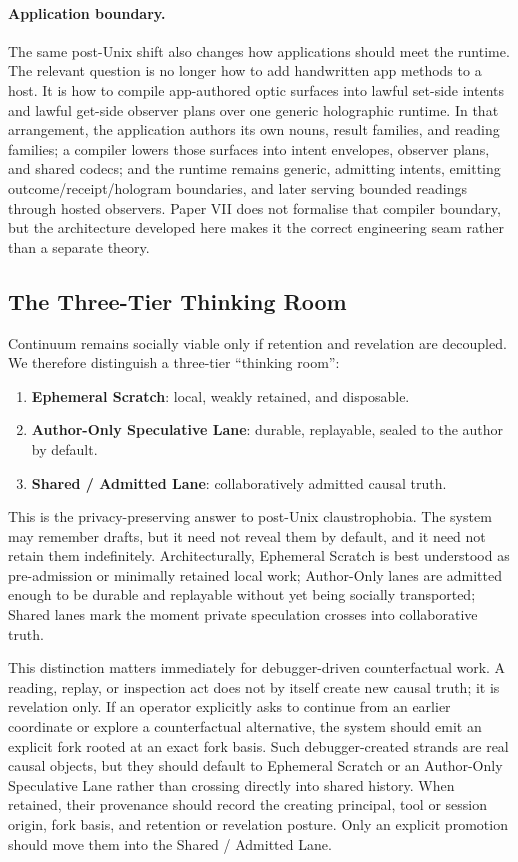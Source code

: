 \documentclass[11pt]{article}
\theoremstyle{definition}
\theoremstyle{plain}
\theoremstyle{remark}
\begin{document}
\paragraph{Application boundary.}
The same post-Unix shift also changes how applications should meet the runtime.
The relevant question is no longer how to add handwritten app methods to a host.
It is how to compile app-authored optic surfaces into lawful set-side intents
and lawful get-side observer plans over one generic holographic runtime. In
that arrangement, the application authors its own nouns, result families, and
reading families; a compiler lowers those surfaces into intent envelopes,
observer plans, and shared codecs; and the runtime remains generic, admitting
intents, emitting outcome/receipt/hologram boundaries, and later serving
bounded readings through hosted observers. Paper VII does not formalise that
compiler boundary, but the architecture developed here makes it the correct
engineering seam rather than a separate theory.

\subsection{The Three-Tier Thinking Room}

Continuum remains socially viable only if retention and revelation are decoupled. We therefore distinguish a three-tier ``thinking room'':

\begin{enumerate}[leftmargin=*]
  \item \textbf{Ephemeral Scratch}: local, weakly retained, and disposable.
  \item \textbf{Author-Only Speculative Lane}: durable, replayable, sealed to the author by default.
  \item \textbf{Shared / Admitted Lane}: collaboratively admitted causal truth.
\end{enumerate}

This is the privacy-preserving answer to post-Unix claustrophobia. The system may remember drafts, but it need not reveal them by default, and it need not retain them indefinitely. Architecturally, Ephemeral Scratch is best understood as pre-admission or minimally retained local work; Author-Only lanes are admitted enough to be durable and replayable without yet being socially transported; Shared lanes mark the moment private speculation crosses into collaborative truth.

This distinction matters immediately for debugger-driven counterfactual work. A reading, replay, or inspection act does not by itself create new causal truth; it is revelation only. If an operator explicitly asks to continue from an earlier coordinate or explore a counterfactual alternative, the system should emit an explicit fork rooted at an exact fork basis. Such debugger-created strands are real causal objects, but they should default to Ephemeral Scratch or an Author-Only Speculative Lane rather than crossing directly into shared history. When retained, their provenance should record the creating principal, tool or session origin, fork basis, and retention or revelation posture. Only an explicit promotion should move them into the Shared / Admitted Lane.
\end{document}
